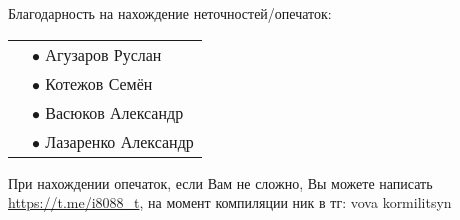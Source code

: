 Благодарность на нахождение неточностей/опечаток:

\begin{tabular}{rl}
    & $\bullet$ Агузаров Руслан \\
    & $\bullet$ Котежов Семён \\
    & $\bullet$ Васюков Александр \\
    & $\bullet$ Лазаренко Александр \\
\end{tabular}

При нахождении опечаток, если Вам не сложно, Вы можете написать \url{https://t.me/i8088_t}, на момент компиляции ник в тг: vova kormilitsyn
